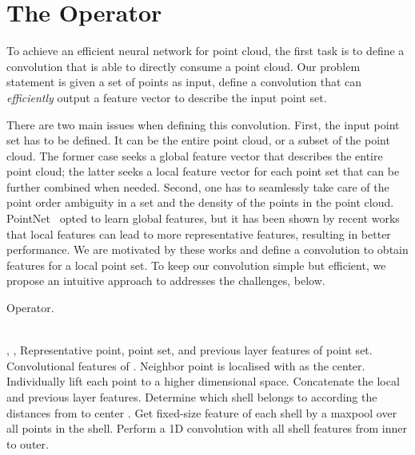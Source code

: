 \documentclass[10pt,twocolumn,letterpaper]{article}
\begin{document}
\section{The \ourconv Operator}
\label{loc_cov}

To achieve an efficient neural network for point cloud, the first task is to define a convolution that is able to directly consume a point cloud. Our problem statement is given a set of points as input, define a convolution that can \emph{efficiently} output a feature vector to describe the input point set. 

There are two main issues when defining this convolution. First, the input point set has to be defined. It can be the entire point cloud, or a subset of the point cloud. The former case seeks a global feature vector that describes the entire point cloud; the latter seeks a local feature vector for each point set that can be further combined when needed.
Second, one has to seamlessly take care of the point order ambiguity in a set and the density of the points in the point cloud. 
PointNet~\cite{qi2017pointnet} opted to learn global features, but it has been shown by recent works~\cite{qi2017pointnet++,li2018pointcnn,wang2018edgeconv,xu2018spidercnn} that local features can lead to more representative features, resulting in better performance. We are motivated by these works and define a convolution to obtain features for a local point set. To keep our convolution simple but efficient, we propose an intuitive approach to addresses the challenges, below.


\begin{algorithm}[t]
	\caption{ \ourconv Operator.}
	\label{alg:conv}
	\begin{algorithmic}[1]
		\Require
		\\, ,  \hfill * Representative point, point set, and previous layer features of point set.
		\Ensure
		 \hfill * Convolutional features of .
		\State   \hfill * Neighbor point  is localised with  as the center.
		\State  \hfill * Individually lift each point  to a higher dimensional space.
		\State  \hfill * Concatenate the local and previous layer features.
		\State  \hfill * Determine which shell  belongs to according the distances from  to center .
		\State  \hfill * Get fixed-size feature of each shell by a maxpool over all points in the shell.
		\State  \hfill * Perform a 1D convolution with all shell features from inner to outer.
		\\
		\Return 
	\end{algorithmic}
\end{algorithm}
\end{document}

